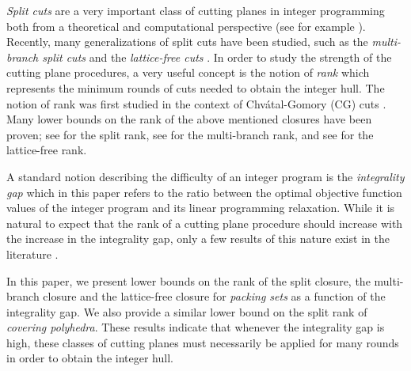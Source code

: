 \documentclass[11pt]{article}
\newcommand{\cred}{\color{black}}
\begin{document}
\emph{Split cuts} are a very important class of cutting planes in integer programming both from a theoretical and computational perspective (see for example \cite{balas:1979, BalasS08, cook:ka:sc:1990}). Recently, many generalizations of split cuts have been studied, such as the \emph{multi-branch split cuts} \cite{dash2014lattice, dash2013t, li:ri:2008} and the \emph{lattice-free cuts} \cite{andersen2007inequalities,basu2015geometric,borozan:2007,RichardDey}. In order to study the strength of the cutting plane procedures, a very useful concept is the notion of \emph{rank} which represents the minimum rounds of cuts needed to obtain the integer hull. The notion of rank was first studied in the context of Chv\'atal-Gomory (CG) cuts \cite{Schrijver80}. Many lower bounds on the rank of the above mentioned closures have been proven; see \cite{BasuCM12,bodur2017cutting,cook:ka:sc:1990,dey:lowerbnd:2009,DeyL11,li:ri:2008} for the split rank, see \cite{dash2013t} for the multi-branch rank, and see \cite{averkov2017approximation} for the lattice-free rank. 

A standard notion describing the {\cred difficulty} of an integer program is the \emph{integrality gap} which in this paper refers to the ratio between the optimal objective function values of the integer program and its linear programming relaxation. While it is natural to expect that the rank of a cutting plane procedure should increase with the increase in the integrality gap, only a few results of this nature exist in the literature \cite{bodur2016aggregation,PokuttaS11}. 

In this paper, we present lower bounds on the rank of the split closure, the multi-branch closure and the lattice-free closure for \emph{packing sets} as a function of the integrality gap. We also provide a similar lower bound on the split rank of \emph{covering polyhedra}. These results indicate that whenever the integrality gap is high, these classes of cutting planes must necessarily be applied for many rounds in order to obtain the integer hull.
\end{document}
